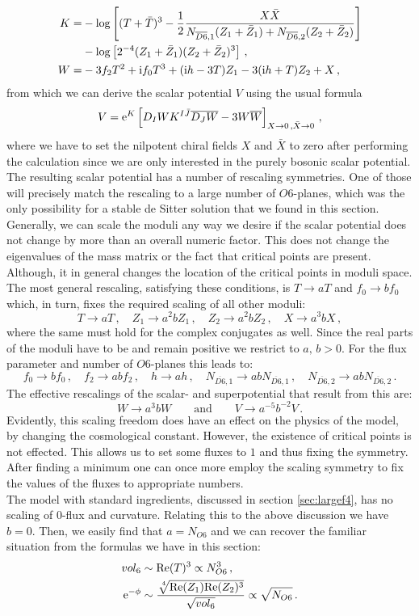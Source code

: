 \documentclass[12pt]{report}
\newcommand{\be}{\begin{equation}}
\newcommand{\ee}{\end{equation}}
\newcommand{\bea}{\begin{equation}\begin{aligned}}
\newcommand{\eea}{\end{aligned}\end{equation}}
\def\rmi{{\rm i}}
\def\rme{{\rm e}}
\def\rmre{{\rm Re}}
\begin{document}
\bea 
K =& -\log\left[(T+\bar{T})^ 3 - \frac{1}{2} \frac{X \bar{X}}{ N_{\overline{D6},1}(Z_1 + \bar{Z}_1) + N_{\overline{D6},2}(Z_2 + \bar{Z}_2)}\right] \\
&- \log\left[2^ {-4} (Z_1 + \bar{Z}_1)(Z_2 + \bar{Z}_2)^ 3\right]\,,\\
W =& -3 f_2 T^ 2 + \rmi f_0 T^ 3 + (\rmi h - 3T) Z_1 - 3(\rmi h+T)Z_2 + X\,,
\eea
from which we can derive the scalar potential $V$ using the usual formula
\be 
V = \rme^ K \left[D_I W K^ {I\bar{J}} \overline{D_J W} - 3 W \overline{W}\right]_{X\to 0\,,\bar{X} \to 0}\,,
\ee
where we have to set the nilpotent chiral fields $X$ and $\bar{X}$ to zero after performing the calculation since we are only interested in the purely bosonic scalar potential.\\
The resulting scalar potential has a number of rescaling symmetries. One of those will precisely match the rescaling to a large number of $O6$-planes, which was the only possibility for a stable de Sitter solution that we found in this section. Generally, we can scale the moduli any way we desire if the scalar potential does not change by more than an overall numeric factor. This does not change the eigenvalues of the mass matrix or the fact that critical points are present. Although, it in general changes the location of the critical points in moduli space. The most general rescaling, satisfying these conditions, is $T \to aT$ and $f_0 \to b f_0$ which, in turn, fixes the required scaling of all other moduli:
\be 
T\to aT\,, \quad Z_1 \to a^ 2 b Z_1\,, \quad Z_2 \to a^ 2 b Z_2\,,\quad X \to a^ 3 b X\,,
\ee
where the same must hold for the complex conjugates as well. Since the real parts of the moduli have to be and remain positive we restrict to $a,\,b>0$. For the flux parameter and number of $O6$-planes this leads to:
\be 
f_0 \to b f_0\,,\quad f_2 \to abf_2\,,\quad h\to ah\,,\quad N_{\overline{D6},1} \to ab N_{\overline{D6},1}\,,\quad N_{\overline{D6},2} \to ab N_{\overline{D6},2}\,.
\ee
The effective rescalings of the scalar- and superpotential that result from this are:
\be 
W \to a^ 3 b W \qquad \text{and} \qquad V \to a^ {-5}b^ {-2} V\,.
\ee
Evidently, this scaling freedom does have an effect on the physics of the model, by changing the cosmological constant. However, the existence of critical points is not effected. This allows us to set some fluxes to $1$ and thus fixing the symmetry. After finding a minimum one can once more employ the scaling symmetry to fix the values of the fluxes to appropriate numbers.\\
The model with standard ingredients, discussed in section \ref{sec:largef4}, has no scaling of $0$-flux and curvature. Relating this to the above discussion we have $b=0$. Then, we easily find that $a =N_{O6}$ and we can recover the familiar situation from the formulas we have in this section:
\bea 
vol_6 &\sim \rmre(T)^ 3 \propto N^ 3_{O6}\,,\\
\rme^ {-\phi} &\sim \frac{\sqrt[\leftroot{-2}\uproot{2} 4]{\rmre(Z_1)\rmre(Z_2)^ 3}}{\sqrt{vol_6}} \propto \sqrt{N_{O6}}\,.
\eea
\end{document}
